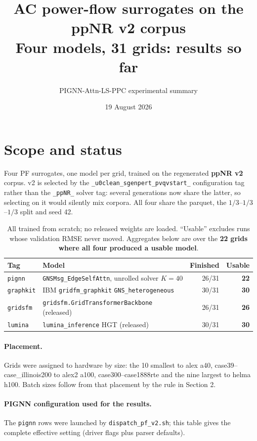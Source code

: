 \documentclass[10pt]{article}
\title{AC power-flow surrogates on the ppNR v2 corpus\\\large Four models, 31 grids: results so far}
\author{PIGNN-Attn-LS-PPC experimental summary}
\date{19 August 2026}
\begin{document}
\maketitle

\section{Scope and status}

Four PF surrogates, one model per grid, trained on the regenerated \textbf{ppNR
v2} corpus. v2 is selected by the \texttt{\_u0clean\_sgenpert\_pvqvstart\_}
configuration tag rather than the \texttt{\_ppNR\_} solver tag: several
generations now share the latter, so selecting on it would silently mix corpora.
All four share the parquet, the $1/3$--$1/3$--$1/3$ split and seed 42.

\begin{table}[H]
\centering\small
\begin{tabular}{llrr}
\toprule
Tag & Model & Finished & Usable \\
\midrule
\texttt{pignn}    & \texttt{GNSMsg\_EdgeSelfAttn}, unrolled solver $K=40$ & 26/31 & \textbf{22} \\
\texttt{graphkit} & IBM \texttt{gridfm\_graphkit} \texttt{GNS\_heterogeneous} & 30/31 & \textbf{30} \\
\texttt{gridsfm}  & \texttt{gridsfm.GridTransformerBackbone} (released) & 26/31 & \textbf{26} \\
\texttt{lumina}   & \texttt{lumina\_inference} HGT (released) & 30/31 & \textbf{30} \\
\bottomrule
\end{tabular}
\caption{All trained from scratch; no released weights are loaded. ``Usable''
excludes runs whose validation RMSE never moved. Aggregates below are over the
\textbf{22 grids where all four produced a usable model}.}
\end{table}

\paragraph{Placement.} Grids were assigned to hardware by size: the 10 smallest
to alex a40, case39--case\_illinois200 to alex2 a100, case300--case1888rte and
the nine largest to helma h100. Batch sizes follow from that placement by the
rule in Section 2.

\paragraph{PIGNN configuration used for the results.} The \texttt{pignn} rows
were launched by \texttt{dispatch\_pf\_v2.sh}; this table gives the complete
effective setting (driver flags plus parser defaults).
\end{document}

